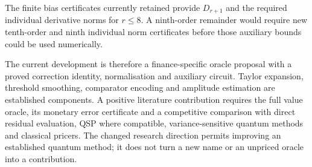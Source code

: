 The finite bias certificates currently retained provide $D_{r+1}$ and
the required individual derivative norms for $r\leq8$. A ninth-order
remainder would require new tenth-order and ninth individual norm
certificates before those auxiliary bounds could be used numerically.

The current development is therefore a finance-specific oracle proposal
with a proved correction identity, normalisation and auxiliary circuit.
Taylor expansion, threshold smoothing, comparator encoding and amplitude
estimation are established components. A positive literature contribution
requires the full value oracle, its monetary error certificate and a
competitive comparison with direct residual evaluation, QSP where
compatible, variance-sensitive quantum methods and classical pricers.
The changed research direction permits improving an established quantum
method; it does not turn a new name or an unpriced oracle into a contribution.
